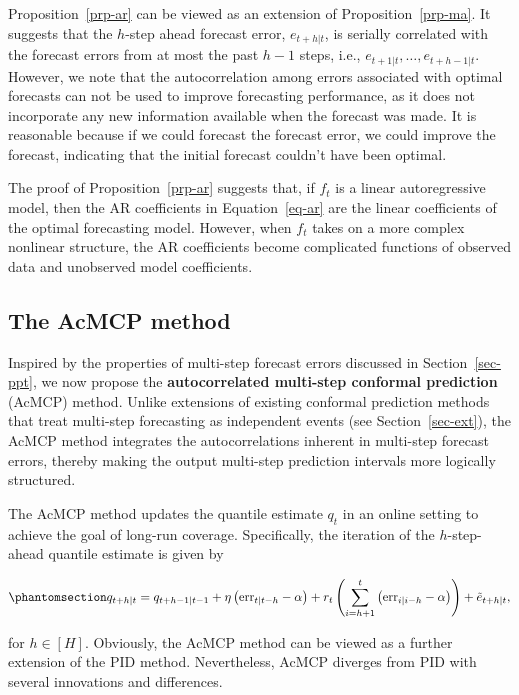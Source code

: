 \documentclass[
  11pt,
  a4paper,
]{article}
\theoremstyle{plain}
\theoremstyle{remark}
\begin{document}
Proposition~\ref{prp-ar} can be viewed as an extension of
Proposition~\ref{prp-ma}. It suggests that the \(h\)-step ahead forecast
error, \(e_{t+h|t}\), is serially correlated with the forecast errors
from at most the past \(h-1\) steps, i.e.,
\(e_{t+1|t}, \ldots, e_{t+h-1|t}\). However, we note that the
autocorrelation among errors associated with optimal forecasts can not
be used to improve forecasting performance, as it does not incorporate
any new information available when the forecast was made. It is
reasonable because if we could forecast the forecast error, we could
improve the forecast, indicating that the initial forecast couldn't have
been optimal.

The proof of Proposition~\ref{prp-ar} suggests that, if \(f_t\) is a
linear autoregressive model, then the AR coefficients in
Equation~\ref{eq-ar} are the linear coefficients of the optimal
forecasting model. However, when \(f_t\) takes on a more complex
nonlinear structure, the AR coefficients become complicated functions of
observed data and unobserved model coefficients.

\subsection{The AcMCP method}\label{sec-novel}

Inspired by the properties of multi-step forecast errors discussed in
Section~\ref{sec-ppt}, we now propose the \textbf{autocorrelated
multi-step conformal prediction} (AcMCP) method. Unlike extensions of
existing conformal prediction methods that treat multi-step forecasting
as independent events (see Section~\ref{sec-ext}), the AcMCP method
integrates the autocorrelations inherent in multi-step forecast errors,
thereby making the output multi-step prediction intervals more logically
structured.

The AcMCP method updates the quantile estimate \(q_t\) in an online
setting to achieve the goal of long-run coverage. Specifically, the
iteration of the \(h\)-step-ahead quantile estimate is given by

\begin{equation}\phantomsection\label{eq-acmcp}{
q_{t+h|t}=q_{t+h-1|t-1}+\eta \left(\mathrm{err}_{t|t-h}-\alpha\right)+r_t\left(\sum_{i=h+1}^t \left(\mathrm{err}_{i|i-h}-\alpha\right)\right)+\tilde{e}_{t+h|t},
}\end{equation}

for \(h\in[H]\). Obviously, the AcMCP method can be viewed as a further
extension of the PID method. Nevertheless, AcMCP diverges from PID with
several innovations and differences.
\end{document}
